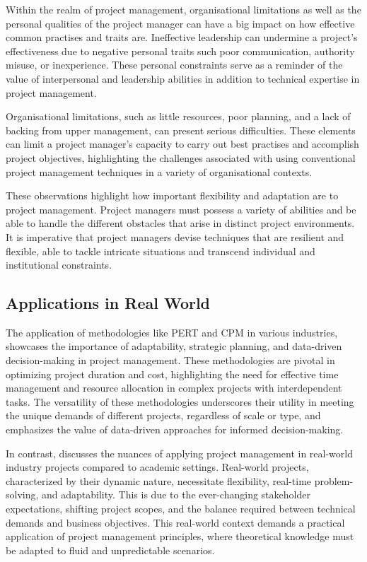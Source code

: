 \documentclass{article}
\begin{document}

Within the realm of project management, organisational limitations as well as the personal qualities of the project manager can have a big impact on how effective common practises and traits are. Ineffective leadership can undermine a project's effectiveness due to negative personal traits such poor communication, authority misuse, or inexperience. These personal constraints serve as a reminder of the value of interpersonal and leadership abilities in addition to technical expertise in project management.

Organisational limitations, such as little resources, poor planning, and a lack of backing from upper management, can present serious difficulties. These elements can limit a project manager's capacity to carry out best practises and accomplish project objectives, highlighting the challenges associated with using conventional project management techniques in a variety of organisational contexts.

These observations highlight how important flexibility and adaptation are to project management. Project managers must possess a variety of abilities and be able to handle the different obstacles that arise in distinct project environments. It is imperative that project managers devise techniques that are resilient and flexible, able to tackle intricate situations and transcend individual and institutional constraints.\cite{toor2009ineffective}

\subsection{Applications in Real World}
The application of methodologies like PERT and CPM in various industries\cite{cicmil2006rethinking}, showcases the importance of adaptability, strategic planning, and data-driven decision-making in project management. These methodologies are pivotal in optimizing project duration and cost, highlighting the need for effective time management and resource allocation in complex projects with interdependent tasks. The versatility of these methodologies underscores their utility in meeting the unique demands of different projects, regardless of scale or type, and emphasizes the value of data-driven approaches for informed decision-making.

In contrast\cite{knudson2009software}, discusses the nuances of applying project management in real-world industry projects compared to academic settings. Real-world projects, characterized by their dynamic nature, necessitate flexibility, real-time problem-solving, and adaptability. This is due to the ever-changing stakeholder expectations, shifting project scopes, and the balance required between technical demands and business objectives. This real-world context demands a practical application of project management principles, where theoretical knowledge must be adapted to fluid and unpredictable scenarios.
\end{document}
